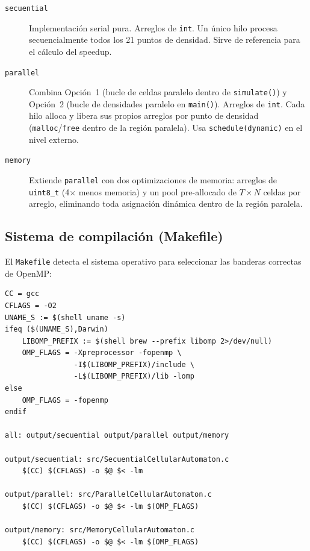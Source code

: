 \documentclass{article}
\begin{document}
\begin{description}
    \item[\texttt{secuential}] Implementaci\'on serial pura. Arreglos de \texttt{int}.
         Un \'unico hilo procesa secuencialmente todos los 21 puntos de densidad.
         Sirve de referencia para el c\'alculo del speedup.

    \item[\texttt{parallel}] Combina Opci\'on~1 (bucle de celdas paralelo dentro de
         \texttt{simulate()}) y Opci\'on~2 (bucle de densidades paralelo en
         \texttt{main()}). Arreglos de \texttt{int}. Cada hilo alloca y libera sus
         propios arreglos por punto de densidad (\texttt{malloc}/\texttt{free} dentro de
         la regi\'on paralela). Usa \texttt{schedule(dynamic)} en el nivel externo.

    \item[\texttt{memory}] Extiende \texttt{parallel} con dos optimizaciones de memoria:
         arreglos de \texttt{uint8\_t} (4$\times$ menos memoria) y un pool pre-allocado
         de $T \times N$ celdas por arreglo, eliminando toda asignaci\'on din\'amica
         dentro de la regi\'on paralela.
\end{description}

\subsection{Sistema de compilaci\'on (Makefile)}

El \texttt{Makefile} detecta el sistema operativo para seleccionar las banderas correctas
de OpenMP:

\begin{lstlisting}
CC = gcc
CFLAGS = -O2
UNAME_S := $(shell uname -s)
ifeq ($(UNAME_S),Darwin)
    LIBOMP_PREFIX := $(shell brew --prefix libomp 2>/dev/null)
    OMP_FLAGS = -Xpreprocessor -fopenmp \
                -I$(LIBOMP_PREFIX)/include \
                -L$(LIBOMP_PREFIX)/lib -lomp
else
    OMP_FLAGS = -fopenmp
endif

all: output/secuential output/parallel output/memory

output/secuential: src/SecuentialCellularAutomaton.c
    $(CC) $(CFLAGS) -o $@ $< -lm

output/parallel: src/ParallelCellularAutomaton.c
    $(CC) $(CFLAGS) -o $@ $< -lm $(OMP_FLAGS)

output/memory: src/MemoryCellularAutomaton.c
    $(CC) $(CFLAGS) -o $@ $< -lm $(OMP_FLAGS)
\end{lstlisting}
\end{document}

